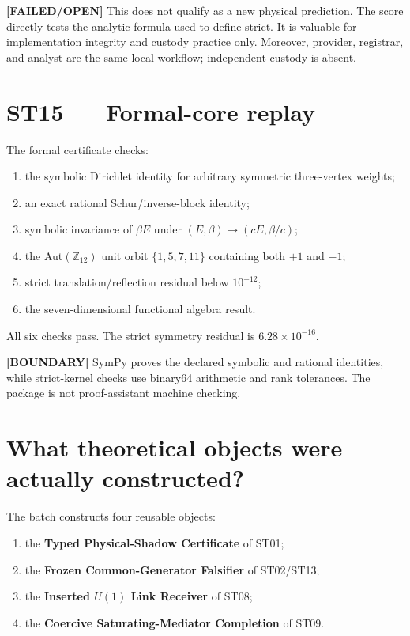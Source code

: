\documentclass[11pt,a4paper]{article}
\newcommand{\failed}{\textcolor{red!72!black}{\textbf{[FAILED/OPEN]}}}
\newcommand{\boundary}{\textcolor{orange!80!black}{\textbf{[BOUNDARY]}}}
\begin{document}
\failed{} This does not qualify as a new physical prediction. The score directly tests the analytic formula used to define strict. It is valuable for implementation integrity and custody practice only. Moreover, provider, registrar, and analyst are the same local workflow; independent custody is absent.

\section{ST15 --- Formal-core replay}

The formal certificate checks:
\begin{enumerate}
\item the symbolic Dirichlet identity for arbitrary symmetric three-vertex weights;
\item an exact rational Schur/inverse-block identity;
\item symbolic invariance of $\beta E$ under $(E,\beta)\mapsto(cE,\beta/c)$;
\item the Aut$(\mathbb Z_{12})$ unit orbit $\{1,5,7,11\}$ containing both $+1$ and $-1$;
\item strict translation/reflection residual below $10^{-12}$;
\item the seven-dimensional functional algebra result.
\end{enumerate}
All six checks pass. The strict symmetry residual is $6.28\times10^{-16}$.

\boundary{} SymPy proves the declared symbolic and rational identities, while strict-kernel checks use binary64 arithmetic and rank tolerances. The package is not proof-assistant machine checking.

\section{What theoretical objects were actually constructed?}

The batch constructs four reusable objects:
\begin{enumerate}
\item the \textbf{Typed Physical-Shadow Certificate} of ST01;
\item the \textbf{Frozen Common-Generator Falsifier} of ST02/ST13;
\item the \textbf{Inserted $U(1)$ Link Receiver} of ST08;
\item the \textbf{Coercive Saturating-Mediator Completion} of ST09.
\end{enumerate}
\end{document}
